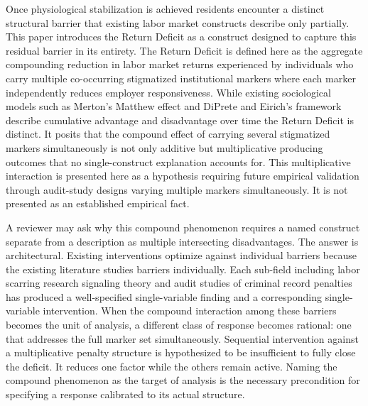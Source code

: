\documentclass[12pt, letterpaper]{article}
\begin{document}
Once physiological stabilization is achieved residents encounter a distinct structural barrier that existing labor market constructs describe only partially. This paper introduces the Return Deficit as a construct designed to capture this residual barrier in its entirety. The Return Deficit is defined here as the aggregate compounding reduction in labor market returns experienced by individuals who carry multiple co-occurring stigmatized institutional markers where each marker independently reduces employer responsiveness. While existing sociological models such as Merton's Matthew effect and DiPrete and Eirich's framework \citep{diprete2006cumulative} describe cumulative advantage and disadvantage over time the Return Deficit is distinct. It posits that the compound effect of carrying several stigmatized markers simultaneously is not only additive but multiplicative producing outcomes that no single-construct explanation accounts for. This multiplicative interaction is presented here as a hypothesis requiring future empirical validation through audit-study designs varying multiple markers simultaneously. It is not presented as an established empirical fact.

A reviewer may ask why this compound phenomenon requires a named construct separate from a description as multiple intersecting disadvantages. The answer is architectural. Existing interventions optimize against individual barriers because the existing literature studies barriers individually. Each sub-field including labor scarring research signaling theory and audit studies of criminal record penalties has produced a well-specified single-variable finding and a corresponding single-variable intervention. When the compound interaction among these barriers becomes the unit of analysis, a different class of response becomes rational: one that addresses the full marker set simultaneously. Sequential intervention against a multiplicative penalty structure is hypothesized to be insufficient to fully close the deficit. It reduces one factor while the others remain active. Naming the compound phenomenon as the target of analysis is the necessary precondition for specifying a response calibrated to its actual structure.
\end{document}
